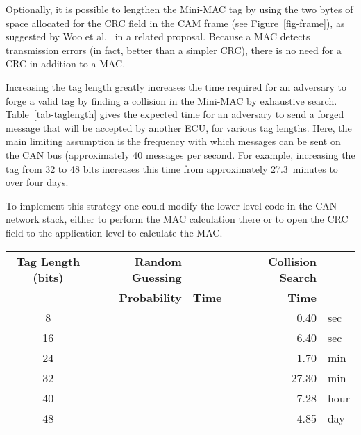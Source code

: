 Optionally, it is possible to lengthen the Mini-MAC tag by 
using the two bytes of space allocated for the CRC field in the CAM frame (see Figure~\ref{fig-frame}),
as suggested by Woo et al.~\cite{Woo-14} in a related proposal.
Because a MAC detects transmission errors (in fact, better than a simpler CRC), there is no need for
a CRC in addition to a MAC.  

Increasing the tag length greatly increases the time required for an adversary to forge a valid tag by
finding a collision in the Mini-MAC by exhaustive search.  
Table~\ref{tab-taglength} gives the expected time for an adversary to send a forged message 
that will be accepted by another ECU, for various tag lengths.  Here, the main limiting assumption is 
the frequency with which messages can be sent on the CAN bus 
(approximately 40 messages per second. 
For example, increasing the tag from 32 to 48 bits increases this time from
approximately 27.3~minutes to over four days.


To implement this strategy one could modify the lower-level code in the CAN network stack, 
either to perform the MAC calculation there 
or to open the CRC field to the application level to calculate the MAC.


\begin{table*}	
	\centering
	
	\caption{Probability and expected time for a spoofed message to be accepted by an ECU for various tag lengths
	for two attack scenarios.  In random guessing, the adversary guesses a tag.
	In the hypothetical collision search, the adversary seeks a Mini-MAC collision.
	Probability denotes the proability of success for one trial.
	Expected time denotes the expected time for the cummulative success probability to be~0.5.
	All calculations assume the adversary injects 40 forged messages per second.}
	
	\label{tab-taglength}
	\vspace{8pt}
	\begin{tabular}{c|rrl|rl}%
	{\bf Tag Length (bits)} & {\bf Random Guessing} &&& {\bf Collision Search} & \\
	& {\bf Probability} & {\bf Time} & & {\bf Time} & \\\hline
	8  && & & 0.40 & sec \\
	16 && & & 6.40 & sec \\
	24 && & & 1.70 & min \\
	32 && & & 27.30 & min \\
	40 && & & 7.28 & hour \\
	48 && & & 4.85 & day \\
	\end{tabular}
	\end{table*}

